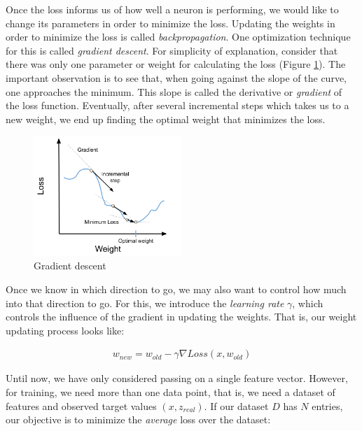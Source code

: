 \label{02_nn_loss_back_propagation}

Once the loss informs us of how well a neuron is performing, we would like to change its parameters in order to minimize the loss. Updating the weights in order to minimize the loss is called \emph{backpropagation}.
One optimization technique for this is called \emph{gradient descent}.  For simplicity of explanation, consider that there was only one parameter or weight for calculating the loss (Figure \ref{fig:02_nn_gradient_descent}). The important observation is to see that, when going against the slope of the curve, one approaches the minimum. This slope is called the derivative or \emph{gradient} of the loss function. Eventually, after several incremental steps which takes us to a new weight, we end up finding the optimal weight that minimizes the loss.

\begin{figure}
    \centering
    \includegraphics[width=0.5\textwidth]{Figures/02/02_gradient_descent.png}
    \caption{Gradient descent}
    \label{fig:02_nn_gradient_descent}
\end{figure}

Once we know in which direction to go, we may also want to control how much into that direction to go. For this, we introduce the \emph{learning rate} $\gamma$, which controls the influence of the gradient in updating the weights. That is, our weight updating process looks like:

\begin{align}
    w_{new} = w_{old} - \gamma \nabla Loss(x, w_{old})  \label{eq:02_nn_gradient_descent}
\end{align}


\label{02_nn_training}

Until now, we have only considered passing on a single feature vector. However, for training, we need more than one data point, that is, we need a dataset of features and observed target values $(x,z_{real})$. If our dataset $D$ has $N$ entries, our objective is to minimize the \emph{average} loss over the dataset:

